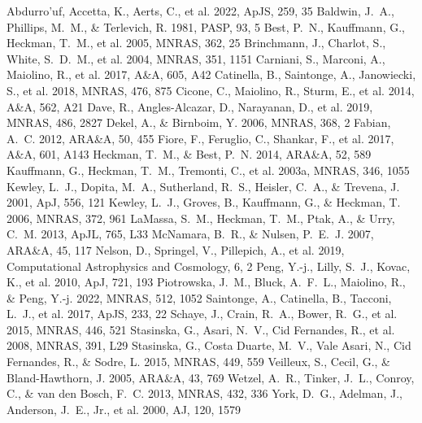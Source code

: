 \documentclass[twocolumn]{aastex631}
\begin{document}
\begin{thebibliography}{}
 Abdurro'uf, Accetta, K., Aerts, C., et al. 2022, ApJS, 259, 35
 Baldwin, J.~A., Phillips, M.~M., \& Terlevich, R. 1981, PASP, 93, 5
 Best, P.~N., Kauffmann, G., Heckman, T.~M., et al. 2005, MNRAS, 362, 25
 Brinchmann, J., Charlot, S., White, S.~D.~M., et al. 2004, MNRAS, 351, 1151
 Carniani, S., Marconi, A., Maiolino, R., et al. 2017, A\&A, 605, A42
 Catinella, B., Saintonge, A., Janowiecki, S., et al. 2018, MNRAS, 476, 875
 Cicone, C., Maiolino, R., Sturm, E., et al. 2014, A\&A, 562, A21
 Dave, R., Angles-Alcazar, D., Narayanan, D., et al. 2019, MNRAS, 486, 2827
 Dekel, A., \& Birnboim, Y. 2006, MNRAS, 368, 2
 Fabian, A.~C. 2012, ARA\&A, 50, 455
 Fiore, F., Feruglio, C., Shankar, F., et al. 2017, A\&A, 601, A143
 Heckman, T.~M., \& Best, P.~N. 2014, ARA\&A, 52, 589
 Kauffmann, G., Heckman, T.~M., Tremonti, C., et al. 2003a, MNRAS, 346, 1055
 Kewley, L.~J., Dopita, M.~A., Sutherland, R.~S., Heisler, C.~A., \& Trevena, J. 2001, ApJ, 556, 121
 Kewley, L.~J., Groves, B., Kauffmann, G., \& Heckman, T. 2006, MNRAS, 372, 961
 LaMassa, S.~M., Heckman, T.~M., Ptak, A., \& Urry, C.~M. 2013, ApJL, 765, L33
 McNamara, B.~R., \& Nulsen, P.~E.~J. 2007, ARA\&A, 45, 117
 Nelson, D., Springel, V., Pillepich, A., et al. 2019, Computational Astrophysics and Cosmology, 6, 2
 Peng, Y.-j., Lilly, S.~J., Kovac, K., et al. 2010, ApJ, 721, 193
 Piotrowska, J.~M., Bluck, A.~F.~L., Maiolino, R., \& Peng, Y.-j. 2022, MNRAS, 512, 1052
 Saintonge, A., Catinella, B., Tacconi, L.~J., et al. 2017, ApJS, 233, 22
 Schaye, J., Crain, R.~A., Bower, R.~G., et al. 2015, MNRAS, 446, 521
 Stasinska, G., Asari, N.~V., Cid Fernandes, R., et al. 2008, MNRAS, 391, L29
 Stasinska, G., Costa Duarte, M.~V., Vale Asari, N., Cid Fernandes, R., \& Sodre, L. 2015, MNRAS, 449, 559
 Veilleux, S., Cecil, G., \& Bland-Hawthorn, J. 2005, ARA\&A, 43, 769
 Wetzel, A.~R., Tinker, J.~L., Conroy, C., \& van den Bosch, F.~C. 2013, MNRAS, 432, 336
 York, D.~G., Adelman, J., Anderson, J.~E., Jr., et al. 2000, AJ, 120, 1579
\end{thebibliography}
\end{document}
